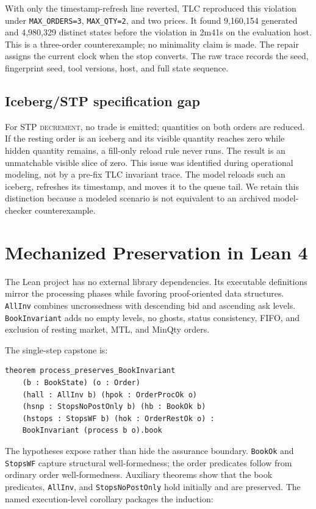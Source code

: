 \documentclass[runningheads]{llncs}
\begin{document}
With only the timestamp-refresh line reverted, TLC reproduced this violation
under \texttt{MAX\_ORDERS=3}, \texttt{MAX\_QTY=2}, and two prices. It found
9,160,154 generated and 4,980,329 distinct states before the violation in
2m41s on the evaluation host. This is a three-order counterexample; no
minimality claim is made. The repair assigns the current clock when the stop
converts. The raw trace records the seed, fingerprint seed, tool versions,
host, and full state sequence.

\subsection{Iceberg/STP specification gap}

For STP \textsc{decrement}, no trade is emitted; quantities on both orders are
reduced. If the resting order is an iceberg and its visible quantity reaches
zero while hidden quantity remains, a fill-only reload rule never runs. The
result is an unmatchable visible slice of zero. This issue was identified
during operational modeling, not by a pre-fix TLC invariant trace. The model
reloads such an iceberg, refreshes its timestamp, and moves it to the queue
tail. We retain this distinction because a modeled scenario is not equivalent
to an archived model-checker counterexample.

\section{Mechanized Preservation in Lean 4}

The Lean project has no external library dependencies. Its executable
definitions mirror the processing phases while favoring proof-oriented data
structures. \texttt{AllInv} combines uncrossedness with descending bid and
ascending ask levels. \texttt{BookInvariant} adds no empty levels, no ghosts,
status consistency, FIFO, and exclusion of resting market, MTL, and MinQty
orders.

The single-step capstone is:

\begin{lstlisting}
theorem process_preserves_BookInvariant
    (b : BookState) (o : Order)
    (hall : AllInv b) (hpok : OrderProcOk o)
    (hsnp : StopsNoPostOnly b) (hb : BookOk b)
    (hstops : StopsWF b) (hok : OrderRestOk o) :
    BookInvariant (process b o).book
\end{lstlisting}

The hypotheses expose rather than hide the assurance boundary. \texttt{BookOk}
and \texttt{StopsWF} capture structural well-formedness; the order predicates
follow from ordinary order well-formedness. Auxiliary theorems show that the
book predicates, \texttt{AllInv}, and \texttt{StopsNoPostOnly} hold initially
and are preserved. The named execution-level corollary packages the induction:
\end{document}
